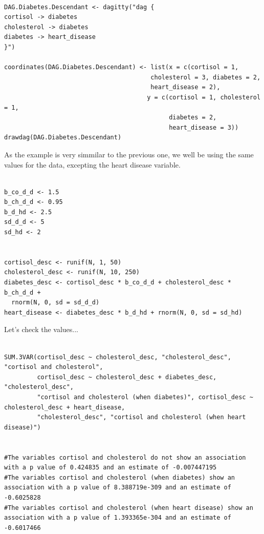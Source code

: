 \documentclass{article}
\begin{document}
\begin{lstlisting}

DAG.Diabetes.Descendant <- dagitty("dag {
cortisol -> diabetes
cholesterol -> diabetes
diabetes -> heart_disease
}")

coordinates(DAG.Diabetes.Descendant) <- list(x = c(cortisol = 1, 
                                        cholesterol = 3, diabetes = 2,
                                        heart_disease = 2),
                                       y = c(cortisol = 1, cholesterol = 1, 
                                             diabetes = 2,  
                                             heart_disease = 3))
drawdag(DAG.Diabetes.Descendant)

\end{lstlisting}





As the example is very simmilar to the previous one, we well be using the same values for the data, excepting the heart disease variable.
 
 
\begin{lstlisting}
 
b_co_d_d <- 1.5
b_ch_d_d <- 0.95
b_d_hd <- 2.5
sd_d_d <- 5
sd_hd <- 2


cortisol_desc <- runif(N, 1, 50)
cholesterol_desc <- runif(N, 10, 250)
diabetes_desc <- cortisol_desc * b_co_d_d + cholesterol_desc * b_ch_d_d + 
  rnorm(N, 0, sd = sd_d_d)
heart_disease <- diabetes_desc * b_d_hd + rnorm(N, 0, sd = sd_hd)

\end{lstlisting}


Let's check the values...

\begin{lstlisting}

SUM.3VAR(cortisol_desc ~ cholesterol_desc, "cholesterol_desc", "cortisol and cholesterol", 
         cortisol_desc ~ cholesterol_desc + diabetes_desc, "cholesterol_desc",
         "cortisol and cholesterol (when diabetes)", cortisol_desc ~ cholesterol_desc + heart_disease,
         "cholesterol_desc", "cortisol and cholesterol (when heart disease)")


#The variables cortisol and cholesterol do not show an association with a p value of 0.424835 and an estimate of -0.007447195 
#The variables cortisol and cholesterol (when diabetes) show an association with a p value of 8.388719e-309 and an estimate of -0.6025828 
#The variables cortisol and cholesterol (when heart disease) show an association with a p value of 1.393365e-304 and an estimate of -0.6017466 

\end{lstlisting}
\end{document}
